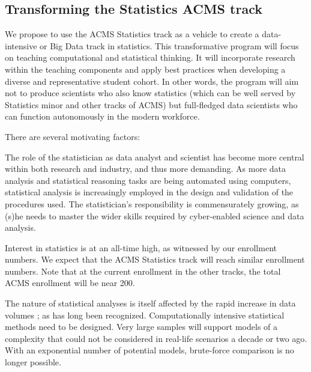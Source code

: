 \subsection{Transforming the Statistics  ACMS track}
We propose to use the ACMS Statistics track as a vehicle to create a
data-intensive or Big Data track in statistics. This transformative
program will focus on teaching computational and statistical thinking.
It will incorporate research within the teaching
components and apply best practices when developing a diverse and
representative student cohort.  In other words, the program will aim not to
produce scientists who also know statistics (which can be well served
by Statistics minor and other tracks of ACMS) but full-fledged
data scientists who can function autonomously in the modern workforce.

There are several motivating factors:
\bit
\item The role of
 the statistician as data analyst and scientist has become more central
 within both research and industry, and thus more demanding.
 As more data analysis and statistical reasoning tasks
 are being automated using computers, statistical analysis is
 increasingly employed in the design and validation of the procedures used.
 The statistician's responsibility is commensurately growing, as (s)he needs
 to master the wider skills required by cyber-enabled science and data
 analysis.
\item Interest in statistics is at an all-time high, as witnessed by
  our enrollment numbers. We expect that the ACMS Statistics track
  will reach similar enrollment numbers. Note that at the current
  enrollment in the other tracks, the total ACMS enrollment will be
  near 200.
\item The nature of statistical analyses is itself affected by the
  rapid increase in data volumes \cite{friedman:97}; as has 
  long been recognized. Computationally intensive statistical methods need to
  be designed. Very large samples will support models of a complexity
  that could not be considered in real-life scenarios a decade or two
  ago. 
  With an exponential number of potential models, brute-force comparison
  is no longer possible.
